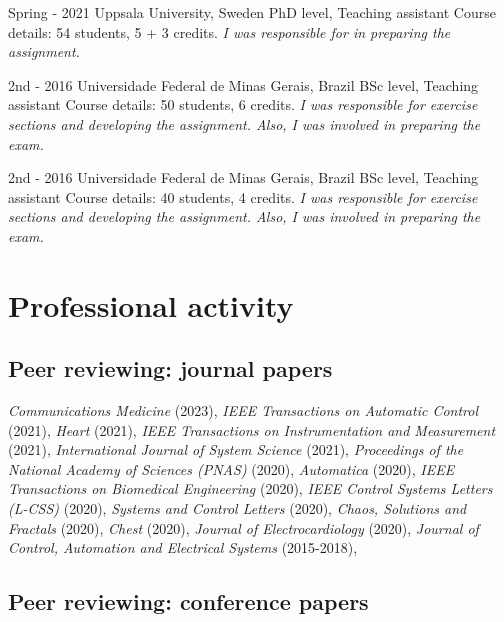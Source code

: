 \documentclass[10pt,letterpaper]{article} %
\begin{document}
    {   Spring - 2021  }
    { Uppsala University, Sweden }
    { PhD level, Teaching assistant }
    { Course details: 54 students, 5 + 3 credits.  \emph{ I was responsible for in preparing the assignment. } }
    
    {   2nd - 2016  }
    { Universidade Federal de Minas Gerais, Brazil }
    { BSc level, Teaching assistant }
    { Course details: 50 students, 6 credits.  \emph{ I was responsible for exercise sections and developing the assignment. Also, I was involved in preparing the exam. } }
    
    {   2nd - 2016  }
    { Universidade Federal de Minas Gerais, Brazil }
    { BSc level, Teaching assistant }
    { Course details: 40 students, 4 credits.  \emph{ I was responsible for exercise sections and developing the assignment. Also, I was involved in preparing the exam. } }
    




\section*{Professional activity}

\subsection*{Peer reviewing: journal papers}

 {\em Communications Medicine } (2023),  {\em IEEE Transactions on Automatic Control } (2021),  {\em Heart } (2021),  {\em IEEE Transactions on Instrumentation and Measurement } (2021),  {\em International Journal of System Science } (2021),  {\em Proceedings of the National Academy of Sciences (PNAS) } (2020),  {\em Automatica } (2020),  {\em IEEE Transactions on Biomedical Engineering } (2020),  {\em IEEE Control Systems Letters (L-CSS) } (2020),  {\em Systems and Control Letters } (2020),  {\em Chaos, Solutions and Fractals } (2020),  {\em Chest } (2020),  {\em Journal of Electrocardiology } (2020),  {\em Journal of Control, Automation and Electrical Systems } (2015-2018), 

\subsection*{Peer reviewing: conference papers}
\end{document}
